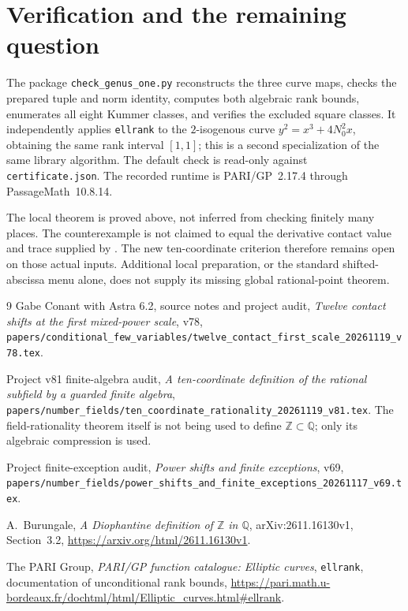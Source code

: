 \documentclass[11pt]{article}
\newcommand{\Q}{\mathbb Q}
\newcommand{\Z}{\mathbb Z}
\theoremstyle{remark}\newtheorem{remark}[theorem]{Remark}
\begin{document}
\section{Verification and the remaining question}
The package \texttt{check\_genus\_one.py} reconstructs the three curve maps,
checks the prepared tuple and norm identity, computes both algebraic rank
bounds, enumerates all eight Kummer classes, and verifies the excluded
square classes. It independently applies \texttt{ellrank} to the
\(2\)-isogenous curve \(y^2=x^3+4N_0^2x\), obtaining the same rank
interval \([1,1]\); this is a second specialization of the same library
algorithm. The default check is read-only against \texttt{certificate.json}.
The recorded runtime is PARI/GP~2.17.4 through PassageMath~10.8.14.

The local theorem is proved above, not inferred from checking finitely
many places. The counterexample is not claimed to equal the derivative
contact value and trace supplied by \cite{eleven}. The new ten-coordinate
criterion therefore remains open on those actual inputs. Additional
local preparation, or the standard shifted-abscissa menu alone, does not
supply its missing global rational-point theorem.

\begin{thebibliography}{9}
Gabe Conant with Astra 6.2, source notes and project audit,
\emph{Twelve contact shifts at the first mixed-power scale}, v78,
\nolinkurl{papers/conditional_few_variables/twelve_contact_first_scale_20261119_v78.tex}.

Project v81 finite-algebra audit,
\emph{A ten-coordinate definition of the rational subfield by a guarded finite algebra},
\nolinkurl{papers/number_fields/ten_coordinate_rationality_20261119_v81.tex}.
The field-rationality theorem itself is not being used to define
\(\Z\subset\Q\); only its algebraic compression is used.

Project finite-exception audit,
\emph{Power shifts and finite exceptions}, v69,
\nolinkurl{papers/number_fields/power_shifts_and_finite_exceptions_20261117_v69.tex}.

A.~Burungale, \emph{A Diophantine definition of \(\Z\) in \(\Q\)},
arXiv:2611.16130v1, Section~3.2,
\url{https://arxiv.org/html/2611.16130v1}.

The PARI Group, \emph{PARI/GP function catalogue: Elliptic curves},
\texttt{ellrank}, documentation of unconditional rank bounds,
\url{https://pari.math.u-bordeaux.fr/dochtml/html/Elliptic_curves.html#ellrank}.
\end{thebibliography}
\end{document}
